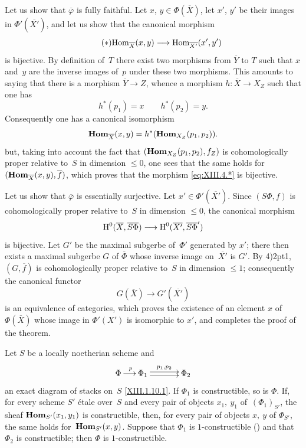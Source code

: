 Let us show that $\overline{\varphi}$ is fully faithful. Let
$x$, $y \in \Phi(\overline{X})$, let $x'$, $y'$ be their images in
$\Phi'(\overline{X'})$, and let us show that the canonical morphism
\begin{equation*}
\label{eq:XIII.4.*} \tag{$*$} {\Hom_{\overline{X}}(x,y)
\to \Hom_{\overline{X'}}(x',y') }
\end{equation*}
is bijective. By definition of~$T$ there exist two morphisms from
$\overline{Y}$ to $T$ such that $x$ and~$y$ are the inverse images
of~$p$ under these two morphisms. This amounts to saying that there is a
morphism $\overline {Y} \to Z$, whence a morphism $h\colon
\overline{X} \to X_Z$ such that one has
$$
h^*(p_1)=x \qquad h^*(p_2)=y.
$$
Consequently one has a canonical isomorphism
$$
\operatorname{\mathbf{Hom}}_{\overline{X}}(x,y)=h^*(\operatorname{\mathbf{Hom}}_{X_Z}(p_1,p_2) ).
$$
but, taking into account the fact that $(\operatorname{\mathbf{Hom}}_{X_Z}(p_1,p_2),f_Z)$ is
cohomologically proper relative to~$S$ in dimension $\le 0$,
one sees that the same holds for
$(\operatorname{\mathbf{Hom}}_{\overline{X}}(x,y),\overline{f})$, which proves that the
morphism \eqref{eq:XIII.4.*} is bijective.

Let us show that $\overline{\varphi}$ is essentially surjective. Let
$x'\in \Phi'(\overline{X'})$. Since $(S\Phi,f)$ is cohomologically
proper relative to~$S$ in dimension $\le 0$, the canonical
morphism
$$
\H^0(\overline{X},\overline{S\Phi}) \to
\H^0(\overline{X'},\overline{S\Phi}')
$$
is bijective. Let $G'$ be the maximal subgerbe of~$\Phi'$
generated by $x'$; there then exists a maximal subgerbe $G$ of
$\overline{\Phi}$ whose inverse image on~$\overline{X'}$ is
$G'$. By 4)\kern2pt1, $(G,\overline{f})$ is cohomologically proper
relative to~$S$ in dimension $\le 1$; consequently the canonical
functor
$$
G(\overline{X}) \to G'(\overline{X'})
$$
is an equivalence of categories, which proves the existence
of an element $x$ of~$\Phi(\overline{X})$ whose image in
$\Phi'(X')$ is isomorphic to $x'$, and completes the
proof of the theorem.

\begin{sublemma}
\label{XIII.3.1.1}
Let $S$ be a locally noetherian scheme and
$$
\xymatrix@C=.5cm{ \Phi \ar[r]^p & \Phi_1 \ar@<2pt>[rr]^{p_1,p_2}
\ar@<-2pt>[rr] && \Phi_2 }
$$
an exact diagram of stacks on~$S$ \eqref{XIII.1.10.1}. If $\Phi_1$
is constructible, so is $\Phi$. If, for every
scheme $S'$ \'etale over~$S$ and every pair
of objects
$x_1,~y_1$ of~$(\Phi_1)_{S'}$, the sheaf $\operatorname{\mathbf{Hom}}_{S'}(x_1,y_1)$
is constructible, then, for every pair of objects $x,~y$ of
$\Phi_{S'}$, the same holds for~$\operatorname{\mathbf{Hom}}_{S'}(x,y)$. Suppose
that $\Phi_1$ is $1$-constructible () and that $\Phi_2$ is
constructible; then $\Phi$ is $1$-constructible.
\end{sublemma}

